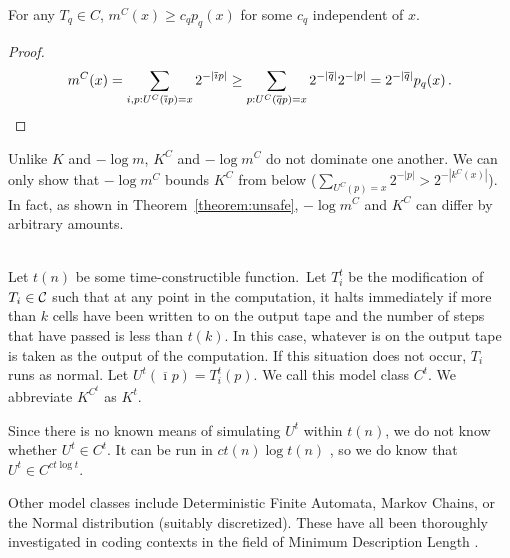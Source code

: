 \begin{lemma}
For any $T_q \in C$, $m^C(x) \geq c_q p_q(x)$ for some $c_q$ independent of $x$.
\label{lemma:universal-bounded-distribution}
\end{lemma}
\begin{proof}\belowdisplayskip=-12pt
\begin{align*}
m^C(x) = \sum_{i,p : U^C(\overline{\imath}p) = x} 2^{-|\overline{\imath}p|} 
\geq \sum_{p : U^C(\overline{q}p) = x} 2^{-|\overline{q}|}2^{-|p|} 
= 2^{-|\overline{q}|} p_q(x) \,\text{.}
\end{align*}
\end{proof}

\noindent Unlike $K$ and $-\log m$, $K^C$ and $-\log m^C$ do not dominate one another. We can only show that $-\log m^C$ bounds $K^C$ from below ($\sum_{U^C(p)=x} 2^{-|p|} > 2^{-|k^C(x)|}$). In fact, as shown in Theorem~\ref{theorem:unsafe}, $-\log m^C$ and $K^C$ can differ by arbitrary amounts.

\renewcommand*{\thefootnote}{\arabic{footnote}}

\begin{example}
\label{example:traditional-time-bounded}
\-\\ Let $t(n)$ be some time-constructible function.\footnotemark~Let $T_i^t$ be the modification of $T_i \in {\cal C}$ such that at any point in the computation, it halts immediately if more than $k$ cells have been written to on the output tape and the number of steps that have passed is less than $t(k)$. In this case, whatever is on the output tape is taken as the output of the computation. If this situation does not occur, $T_i$ runs as normal. Let $U^t(\overline{\imath}p) = T^t_i(p)$. We call this model class $C^t$. We abbreviate $K^{C^t}$ as $K^t$. 

Since there is no known means of simulating $U^t$ within $t(n)$, we do not know whether $U^t \in C^t$. It can be run in $ct(n) \log t(n)$ \cite{DBLP:books/daglib/0087328,DBLP:journals/jacm/HennieS66}, so we do know that $U^t \in C^{ct\log t}$.
\end{example}



\noindent Other model classes include Deterministic Finite Automata, Markov Chains, or the Normal distribution (suitably discretized). These have all been thoroughly investigated in coding contexts in the field of Minimum Description Length \cite{grunwald2007minimum}.

